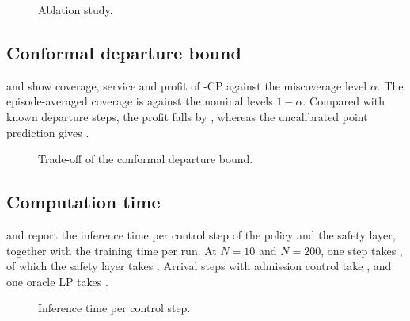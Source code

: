 \begin{figure}[t]
\centering
{}
\caption{Ablation study.}
\label{fig:ablation}
\end{figure}


\subsection{Conformal departure bound}\label{app:res-conformal}

 and  show coverage, service and profit of \method{}-CP against the miscoverage level $\alpha$.
The episode-averaged coverage is  against the nominal levels $1-\alpha$.
Compared with known departure steps, the profit falls by , whereas the uncalibrated point prediction gives .

\begin{figure}[t]
\centering
{}
\caption{Trade-off of the conformal departure bound.}
\label{fig:conformal}
\end{figure}


\subsection{Computation time}\label{app:res-time}

 and  report the inference time per control step of the policy and the safety layer, together with the training time per run.
At $N=10$ and $N=200$, one step takes , of which the safety layer takes .
Arrival steps with admission control take , and one oracle LP takes .

\begin{figure}[t]
\centering
{}
\caption{Inference time per control step.}
\label{fig:inference}
\end{figure}

